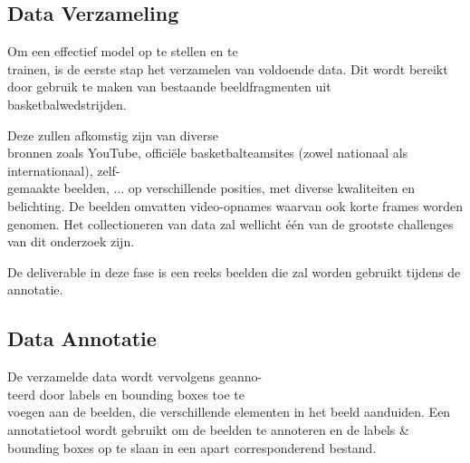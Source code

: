 


\subsection{Data Verzameling}
Om een effectief model op te stellen en te \\trainen, is de eerste stap het verzamelen van voldoende data. 
Dit wordt bereikt door gebruik te maken van bestaande beeldfragmenten uit \\basketbalwedstrijden.

Deze zullen afkomstig zijn van diverse \\bronnen zoals YouTube, officiële basketbalteamsites (zowel nationaal als internationaal), zelf-\\gemaakte beelden, $\ldots$ op verschillende posities, met diverse kwaliteiten en belichting. 
De beelden omvatten video-opnames waarvan ook korte frames worden genomen. Het collectioneren van data zal wellicht één van de grootste challenges van dit onderzoek zijn.

De deliverable in deze fase is een reeks beelden die zal worden gebruikt tijdens de annotatie.


\subsection{Data Annotatie}
De verzamelde data wordt vervolgens geanno-\\teerd door labels en bounding boxes toe te \\voegen aan de beelden, die verschillende elementen in het beeld aanduiden. 
Een annotatietool wordt gebruikt om de beelden te annoteren en de labels \& bounding boxes op te slaan in een apart corresponderend bestand. 

